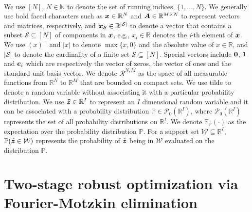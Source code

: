 \documentclass[fleqn,isre,blindrev]{informs4}
\newcommand{\mb}[1]{\mbox{\boldmath \ensuremath{#1}}}
\newcommand{\mbt}[1]{\mb{\tilde{#1}}}
\renewcommand{\Re}{\mathbb{R}}
\begin{document}
	
	\mbox{}\\
	We use $[N]$, $N \in \mathbb{N}$ to denote the set of running indices, $\{1,\dots,N\}$. We generally use bold faced characters such as $\mb{x} \in \Re^N$ and  $\mb{A} \in \Re^{M \times N}$  to represent  vectors and matrices, respectively, and $\mb{x}_{\mathcal{S}} \in \Re^{|\mathcal{S}|}$ to denote a vector that contains a subset  $\mathcal{S} \subseteq [N]$ of components in $\mb{x}$, e.g., $x_i \in \Re$ denotes the {\em i}-th element of $\mb{x}$. We use $(x)^+$ and $|x|$ to denote $\max\{x,0\}$ and the absolute value of $x \in \mathbb{R}$, and $|\mathcal{S}|$ to denote the cardinality of a finite set $\mathcal{S}\subseteq [N]$. Special vectors include $\mb{0}$, $\mb{1}$ and $\mb{e}_i$ which are respectively the vector of zeros, the  vector of ones and the standard unit basis vector.  We denote $\mathcal{R}^{N,M}$ as the space of all measurable functions from $\Re^N$ to $\Re^M$ that are bounded on compact sets. We use tilde to denote a random variable without associating it with a particular probability distribution. We use  $\mbt{z} \in \Re^{I}$ to represent an $I$ dimensional random variable and it  can be associated with a probability  distribution $\mathbb{P} \in \mathcal{P}_0(\Re^{I})$, where $\mathcal{P}_0(\Re^{I})$ represents the set of all probability distributions on $\Re^{I}$.
	We denote  $\mathbb{E}_{\mathbb{P}}(\cdot)$  as the expectation over the probability distribution $\mathbb{P}$. For a support set $\mathcal{W} \subseteq  \Re^{I}$,  $\mathbb{P}(  \mbt{z}  \in \mathcal{W})$ represents the probability  of $\mbt{z}$ being in $\mathcal{W}$ evaluated on the distribution $\mathbb{P}$.
	
\section{Two-stage robust optimization via Fourier-Motzkin elimination} \label{sec:FME}
	
\end{document}
